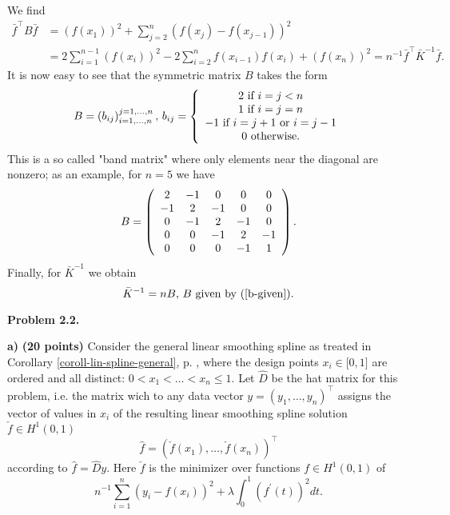 \documentclass[11pt,twoside]{article}%
\theoremstyle{change}
\newenvironment{quote-env}{\begin{quote}\sffamily }{\end{quote}}
\newenvironment{mycomments-env}[1][Mycomments]{\textbf{#1.} \begin{quote-env} }{ \end{quote-env}  \ \rule{0.5em}{0.5em}}
\begin{document}
\begin{mycomments}
\begin{mycomments-env}
We find
\begin{align}
\bar{f}^{\top}B\bar{f}  & =\left(  f(x_{1})\right)  ^{2}+\sum_{j=2}^{n}\left(
f(x_{j})-f(x_{j-1})\right)  ^{2}\label{quadr-form-4}\\
& =2\sum_{i=1}^{n-1}\left(  f(x_{i})\right)  ^{2}-2\sum_{i=2}^{n}%
f(x_{i-1})f(x_{i})+\left(  f(x_{n})\right)  ^{2}=n^{-1}\bar{f}^{\top}\bar
{K}^{-1}\bar{f}.\nonumber
\end{align}
It is now easy to see that the symmetric matrix $B$ takes the form
\begin{equation}
B=\left(  b_{ij}\right)  _{i=1,\ldots,n}^{j=1,\ldots,n}\text{, }%
b_{ij}=\left\{
\begin{array}
[c]{c}%
2\text{ if }i=j<n\\
1\text{ if }i=j=n\\
-1\text{ if }i=j+1\text{ or }i=j-1\\
0\text{ otherwise.}%
\end{array}
\right. \label{b-given}%
\end{equation}
This is a so called "band matrix" where only elements near the diagonal are
nonzero; as an example, for $n=5$ we have
\[
B=\left(
\begin{array}
[c]{ccccc}%
2 & -1 & 0 & 0 & 0\\
-1 & 2 & -1 & 0 & 0\\
0 & -1 & 2 & -1 & 0\\
0 & 0 & -1 & 2 & -1\\
0 & 0 & 0 & -1 & 1
\end{array}
\right)  .
\]
Finally, for $\bar{K}^{-1}$ we obtain
\[
\bar{K}^{-1}=nB\text{, }B\text{ given by (\ref{b-given}).}%
\]

\end{mycomments-env}%

\end{mycomments}%


\bigskip

\textbf{Problem 2.2.}

\textbf{a)} \textbf{(20 points) }Consider the general linear smoothing spline
as treated in Corollary \ref{coroll-lin-spline-general}, p.
\pageref{coroll-lin-spline-general}, where the design points $x_{i}\in
\lbrack0,1]$ are ordered and all distinct: $0<x_{1}<\ldots<x_{n}\leq1$. Let
$\hat{D}$ be the hat matrix for this problem, i.e. the matrix wich to any data
vector $y=\left(  y_{1},\ldots,y_{n}\right)  ^{\top}$ assigns the vector of
values in $x_{i}$ of the resulting linear smoothing spline solution $\check
{f}\in H^{1}(0,1)$
\[
\hat{f}=\left(  \check{f}(x_{1}),\ldots,\check{f}(x_{n})\right)  ^{\top}%
\]
according to $\hat{f}=\hat{D}y$. Here $\check{f}$ is the minimizer over
functions $f\in H^{1}(0,1)$ of
\begin{equation}
n^{-1}\sum_{i=1}^{n}(y_{i}-f(x_{i}))^{2}+\lambda\int_{0}^{1}\left(  f^{\prime
}(t)\right)  ^{2}dt.\label{start-minimize}%
\end{equation}
\end{document}

